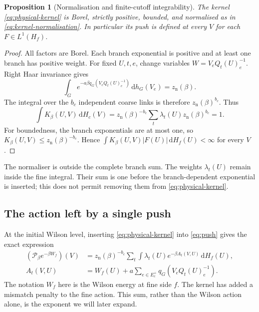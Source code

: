 \documentclass[11pt,reqno]{amsart}
\numberwithin{equation}{section}
\newtheorem{proposition}[theorem]{Proposition}
\theoremstyle{definition}
\theoremstyle{remark}
\newcommand{\dd}{\mathrm d}
\begin{document}
\begin{proposition}[Normalisation and finite-cutoff integrability]
\label{prop:kernel}
The kernel \eqref{eq:physical-kernel} is Borel, strictly positive,
bounded, and normalised as in \eqref{eq:kernel-normalisation}.
In particular its push is defined at every \(V\) for each
\(F\in L^1(H_f)\).
\end{proposition}
\begin{proof}
All factors are Borel. Each branch exponential is positive and at
least one branch has positive weight. For fixed \(U,t,e\), change
variables \(W=V_eQ_t(U)_e^{-1}\). Right Haar invariance gives
\[
 \int_Ge^{-a\beta q_G(V_eQ_t(U)_e^{-1})}\,\dd h_G(V_e)
                         =z_{\mathrm n}(\beta).
\]
The integral over the \(b_c\) independent coarse links is therefore
\(z_{\mathrm n}(\beta)^{b_c}\). Thus
\[
 \int K_\beta(U,V)\,\dd H_c(V)
 =z_{\mathrm n}(\beta)^{-b_c}
      \sum_t\lambda_t(U)z_{\mathrm n}(\beta)^{b_c}=1.
\]
For boundedness, the branch exponentials are at most one, so
\(K_\beta(U,V)\le z_{\mathrm n}(\beta)^{-b_c}\).
Hence \(\int K_\beta(U,V)|F(U)|\,\dd H_f(U)<\infty\) for every
\(V\).
\end{proof}

The normaliser is outside the complete branch sum. The weights
\(\lambda_t(U)\) remain inside the fine integral. Their sum is one
before the branch-dependent exponential is inserted; this does not
permit removing them from \eqref{eq:physical-kernel}.

\subsection{The action left by a single push}

At the initial Wilson level, inserting \eqref{eq:physical-kernel}
into \eqref{eq:push} gives the exact expression
\begin{align}
 (\mathcal P_\beta e^{-\beta W_f})(V)
 &=z_{\mathrm n}(\beta)^{-b_c}
       \sum_t\int\lambda_t(U)e^{-\beta A_t(V,U)}\,\dd H_f(U),
       \label{eq:initial-block-integral}\\
 A_t(V,U)&=W_f(U)+a\sum_{e\in E_c^+}q_G(V_eQ_t(U)_e^{-1}).
       \label{eq:initial-action}
\end{align}
The notation \(W_f\) here is the Wilson energy at fine side \(f\).
The kernel has added a mismatch penalty to the fine action.
This sum, rather than the Wilson action alone, is the exponent we
will later expand.
\end{document}
